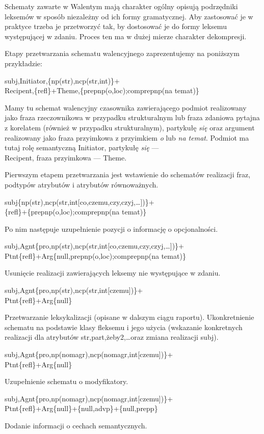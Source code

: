 \documentclass[oneside,pwrcover,withmarginpar,hidelinks,11pt]{article}
\begin{document}
Schematy zawarte w Walentym mają charakter ogólny opisują podrzędniki 
leksemów w sposób niezależny od ich formy gramatycznej.
Aby zastosować je w praktyce trzeba je przetworzyć tak, 
by dostosować je do formy leksemu występującej w zdaniu.
Proces ten ma w dużej mierze charakter dekompresji.

Etapy przetwarzania schematu walencyjnego zaprezentujemy na poniższym przykładzie:
\begin{center}
subj,Initiator,\{np(str),ncp(str,int)\}+\\Recipent,\{refl\}+Theme,\{prepnp(o,loc);comprepnp(na temat)\}
\end{center}
Mamy tu schemat walencyjny czasownika zawierającego podmiot realizowany jako fraza
rzeczownikowa w przypadku strukturalnym lub fraza zdaniowa pytajna z korelatem (również
w przypadku strukturalnym), partykułę {\it się} oraz argument realizowany jako 
fraza przyimkowa z przyimkiem {\it o} lub {\it na temat}.
Podmiot ma tutaj rolę semantyczną Initiator, partykułę {\it się} --- \\Recipent, fraza przyimkowa --- Theme.

Pierwszym etapem przetwarzania jest 
wstawienie do schematów realizacji fraz, podtypów atrybutów i atrybutów równoważnych.
\begin{center}
subj\{np(str),ncp(str,int[co,czemu,czy,czyj,\dots])\}+\\\{refl\}+\{prepnp(o,loc);comprepnp(na temat)\}
\end{center}
Po nim następuje uzupełnienie pozycji o informację o opcjonalności.
\begin{center}
subj,Agnt\{pro,np(str),ncp(str,int[co,czemu,czy,czyj,\dots])\}+\\Ptnt\{refl\}+Arg\{null,prepnp(o,loc);comprepnp(na temat)\}
\end{center}
Usunięcie realizacji zawierających leksemy nie występujące w zdaniu.
\begin{center}
subj,Agnt\{pro,np(str),ncp(str,int[czemu])\}+\\Ptnt\{refl\}+Arg\{null\}
\end{center}
Przetwarzanie leksykalizacji (opisane w dalszym ciągu raportu).
Ukonkretnienie schematu na podstawie klasy fleksemu i jego użycia 
(wskazanie konkretnych realizacji dla atrybutów str,part,żeby2,\dots oraz zmiana realizacji subj).
\begin{center}
subj,Agnt\{pro,np(nomagr),ncp(nomagr,int[czemu])\}+\\Ptnt\{refl\}+Arg\{null\}%
\end{center}
Uzupełnienie schematu o modyfikatory.
\begin{center}
subj,Agnt\{pro,np(nomagr),ncp(nomagr,int[czemu])\}+\\Ptnt\{refl\}+Arg\{null\}+\{null,advp\}+\{null,prepp\}
\end{center}
Dodanie informacji o cechach semantycznych.
\end{document}
